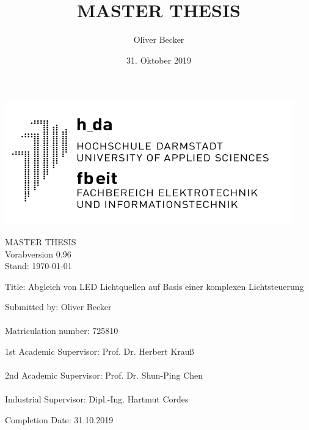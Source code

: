 \documentclass[11pt]{scrartcl}
\title{MASTER THESIS}
\author{Oliver Becker}
\date{31. Oktober 2019} %
\begin{document}
\par\vspace{-1cm}
\begin{flushright}
    \includegraphics[width=0.4\linewidth]{images/logo.png}
\end{flushright}
\vspace{1cm}\noindent
\begin{center}
    \huge MASTER THESIS\\
    \huge \color{red} Vorabversion 0.96\\
    \large Stand: \today
\end{center}
\vspace{1cm}\noindent
{\large Title:  Abgleich von LED Lichtquellen auf Basis einer komplexen Lichtsteuerung}
\par\vspace{3cm}\noindent
Submitted by: \hspace{2cm}             Oliver Becker\\
\\
Matriculation number:  \hspace{.6cm}   725810\\
\par\vspace{2cm}\noindent
1st Academic Supervisor: \hspace{.2cm} Prof. Dr. Herbert Krauß\\
\\
2nd Academic Supervisor: \hspace{.05cm} Prof. Dr. Shun-Ping Chen\\
\\
Industrial Supervisor:   \hspace{.75cm} Dipl.-Ing. Hartmut Cordes\\
\par\vspace{2cm}\noindent
Completion Date: \hspace{1.5cm}         31.10.2019
\clearpage
\end{document}
